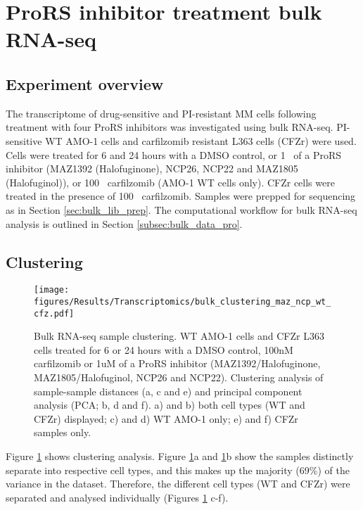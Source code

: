 \clearpage

\section{ProRS inhibitor treatment bulk RNA-seq}

\subsection{Experiment overview}
The transcriptome of drug-sensitive and PI-resistant MM cells following treatment with four ProRS inhibitors was investigated using bulk RNA-seq.
PI-sensitive WT AMO-1 cells and carfilzomib resistant L363 cells (CFZr) were used.
Cells were treated for 6 and 24 hours with a DMSO control, or 1\si{\micro\Molar} of a ProRS inhibitor (MAZ1392 (Halofuginone), NCP26, NCP22 and MAZ1805 (Halofuginol)), or 100\si{\nano\Molar} carfilzomib (AMO-1 WT cells only).
CFZr cells were treated in the presence of 100\si{\nano\Molar} carfilzomib.
Samples were prepped for sequencing as in Section \ref{sec:bulk_lib_prep}.
The computational workflow for bulk RNA-seq analysis is outlined in Section \ref{subsec:bulk_data_pro}.

\subsection{Clustering}

\begin{figure}[p]
\centering
\texttt{[image: figures/Results/Transcriptomics/bulk\_clustering\_maz\_ncp\_wt\_cfz.pdf]}
\caption[Bulk RNA-seq sample clustering]{Bulk RNA-seq sample clustering.
WT AMO-1 cells and CFZr L363 cells treated for 6 or 24 hours with a DMSO control, 100nM carfilzomib or 1uM of a ProRS inhibitor (MAZ1392/Halofuginone, MAZ1805/Halofuginol, NCP26 and NCP22).
Clustering analysis of sample-sample distances (a, c and e) and principal component analysis (PCA; b, d and f).
a) and b) both cell types (WT and CFZr) displayed; c) and d) WT AMO-1 only; e) and f) CFZr samples only.
}
\label{fig:clustering_bulk}\end{figure}

Figure \ref{fig:clustering_bulk} shows clustering analysis.
Figure \ref{fig:clustering_bulk}a and \ref{fig:clustering_bulk}b show the samples distinctly separate into respective cell types, and this makes up the majority (69\%) of the variance in the dataset.
Therefore, the different cell types (WT and CFZr) were separated and analysed individually (Figures \ref{fig:clustering_bulk} c-f).

